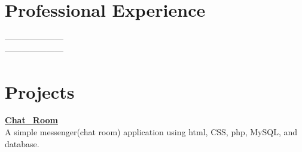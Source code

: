 \documentclass[margin,line]{res}
\newenvironment{list2}{
  \begin{list}{$\bullet$}{%
      \setlength{\itemsep}{0in}
      \setlength{\parsep}{0in} \setlength{\parskip}{0in}
      \setlength{\topsep}{0in} \setlength{\partopsep}{0in}
      \setlength{\leftmargin}{0.2in}}}{\end{list}}
\begin{document}
\begin{resume}
\section{\sc Professional Experience}
---------------------\\
---------------------

\iffalse
{\bf Institution}, City, State. Country. \hfill{August 2008 -- Present}\\
{\em First Job Name}\hfill {Summer 2011, June 2011 -- July 2011}\\
\begin{list2} %
\item Responsible for XYZ \\
\item Responsible for ABC\\
\end{list2}
{\em Second Job Name}\hfill {August 2009 -- January 2010}\\
\begin{list2} %
\item Responsible for XYZ \\
\item Responsible for ABC\\
\end{list2}
{\bf Institution 2}, City, State. Country. \hfill{August 2008 -- Present}\\
{\em First Job Name}\hfill {Summer 2011, June 2011 -- July 2011}\\
\begin{list2} %
\item Responsible for XYZ \\
\item Responsible for ABC\\
\end{list2}
{\em Second Job Name}\hfill {August 2009 -- January 2010}\\
\begin{list2} %
\item Responsible for XYZ \\
\item Responsible for ABC\\
\end{list2}
\fi
\section{\sc Projects}
\href{https://github.com/PurveshMakode24/Chat_Room}{\bf Chat\_Room}\\
A simple messenger(chat room) application using html, CSS, php, MySQL, and database.\\


\end{resume}
\end{document}
